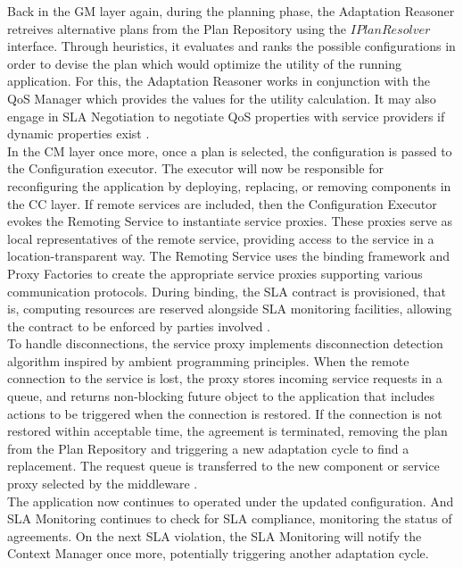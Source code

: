 \documentclass[conference]{IEEEtran}
\begin{document}
Back in the GM layer again, during the planning phase, the Adaptation Reasoner retreives alternative plans from the Plan Repository using the $IPlanResolver$ interface. Through heuristics, it evaluates and ranks the possible configurations in order to devise the plan which would optimize the utility of the running application. For this, the Adaptation Reasoner works in conjunction with the QoS Manager which provides the values for the utility calculation. It may also engage in SLA Negotiation to negotiate QoS properties with service providers if dynamic properties exist \cite{MUSIC_pdf}.\\

In the CM layer once more, once a plan is selected, the configuration is passed to the Configuration executor. The executor will now be responsible for reconfiguring the application by deploying, replacing, or removing components in the CC layer. If remote services are included, then the Configuration Executor evokes the Remoting Service to instantiate service proxies. These proxies serve as local representatives of the remote service, providing access to the service in a location-transparent way. The Remoting Service uses the binding framework and Proxy Factories to create the appropriate service proxies supporting various communication protocols. During binding, the SLA contract is provisioned, that is, computing resources are reserved alongside SLA monitoring facilities, allowing the contract to be enforced by parties involved \cite{MUSIC_pdf}.\\

To handle disconnections, the service proxy implements disconnection detection algorithm inspired by ambient programming  principles. When the remote connection to the service is lost, the proxy stores incoming service requests in a queue, and returns non-blocking future object to the application that includes actions to be triggered when the connection is restored. If the connection is not restored within acceptable time, the agreement is terminated, removing the plan from the Plan Repository and triggering a new adaptation cycle to find a replacement. The request queue is transferred to the new component or service proxy selected by the middleware \cite{MUSIC_pdf}.\\

The application now continues to operated under the updated configuration. And SLA Monitoring continues to check for SLA compliance, monitoring the status of agreements. On the next SLA violation, the SLA Monitoring will notify the Context Manager once more, potentially triggering another adaptation cycle.\\
\end{document}

